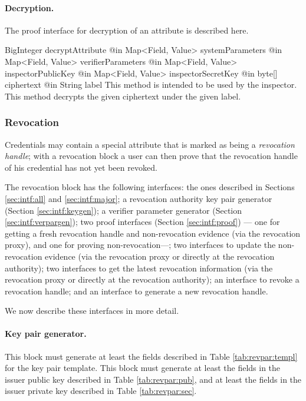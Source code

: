     \paragraph{Decryption.}
    The proof interface for decryption of an attribute is described here.
      \begin{method}
      {BigInteger}
      {decryptAttribute}
      {
        {@in Map<Field, Value> systemParameters}
        {@in Map<Field, Value> verifierParameters}
        {@in Map<Field, Value> inspectorPublicKey}
        {@in Map<Field, Value> inspectorSecretKey}
        {@in byte[] ciphertext}
        {@in String label}
      }
      This method is intended to be used by the inspector.
      This method decrypts the given ciphertext under the given label.
      \end{method}

    \subsubsection{Revocation}

    Credentials may contain a special attribute that is marked as
    being a \emph{revocation handle}; with a revocation block
    a user can then prove that the revocation handle of his
    credential has not yet been revoked.

    The revocation block has the following interfaces:
    the ones described in Sections \ref{sec:intf:all} and \ref{sec:intf:major};
    a revocation authority key pair generator (Section \ref{sec:intf:keygen});
    a verifier parameter generator (Section \ref{sec:intf:verpargen});
    two proof interfaces (Section \ref{sec:intf:proof}) --- one for
    getting a fresh revocation handle and non-revocation evidence (via the revocation proxy),
    and one for proving non-revocation---;
    two interfaces to update the non-revocation evidence (via the revocation proxy or directly at the revocation authority);
    two interfaces to get the latest revocation information (via the revocation proxy or directly at the revocation authority);
    an interface to revoke a revocation handle;
    and an interface to generate a new revocation handle.

    We now describe these interfaces in more detail.
    \paragraph{Key pair generator.}
    This block must generate at least the fields described in Table \ref{tab:revpar:templ} for the key pair
    template.
    This block must generate at least the fields in the issuer public key described in Table \ref{tab:revpar:pub},
    and at least the fields in the issuer private key described in Table \ref{tab:revpar:sec}.

